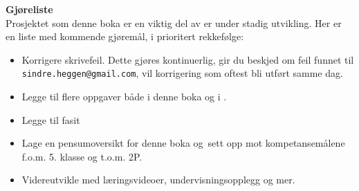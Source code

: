 \newpage
\textbf{Gjøreliste} \\
Prosjektet som denne boka er en viktig del av er under stadig utvikling. Her er en liste med kommende gjøremål, i prioritert rekkefølge:
\begin{itemize}
	\item Korrigere skrivefeil. Dette gjøres kontinuerlig, gir du beskjed om feil funnet til {\tt sindre.heggen@gmail.com}, vil korrigering som oftest bli utført samme dag.
	\item Legge til flere oppgaver både i denne boka og i \mb.
	\item Legge til fasit 
	\item Lage en pensumoversikt for denne boka og \mb\,sett opp mot kompetansemålene f.o.m. 5. klasse og t.o.m. 2P. 
	\item Videreutvikle  med læringsvideoer, undervisningsopplegg og mer. 
\end{itemize}
\newpage

